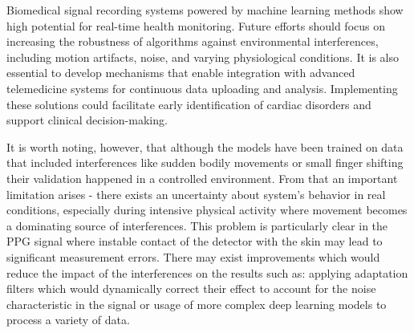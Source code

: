 \documentclass[journal]{IEEEtran}
\begin{document}
Biomedical signal recording systems powered by machine learning methods show high potential for real-time health monitoring. Future efforts should focus on increasing the robustness of algorithms against environmental interferences, including motion artifacts, noise, and varying physiological conditions. It is also essential to develop mechanisms that enable integration with advanced telemedicine systems for continuous data uploading and analysis. Implementing these solutions could facilitate early identification of cardiac disorders and support clinical decision-making.

It is worth noting, however, that although the models have been trained on data that included interferences like sudden bodily movements or small finger shifting their validation happened in a controlled environment. From that an important limitation arises - there exists an uncertainty about system's behavior in real conditions, especially during intensive physical activity where movement becomes a dominating source of interferences. This problem is particularly clear in the PPG signal where instable contact of the detector with the skin may lead to significant measurement errors. There may exist improvements which would reduce the impact of the interferences on the results such as: applying adaptation filters which would dynamically correct their effect to account for the noise characteristic in the signal or usage of more complex deep learning models to process a variety of data.
\end{document}
